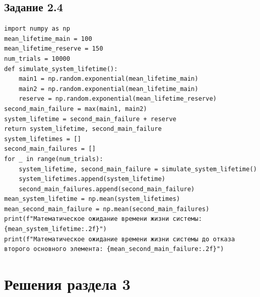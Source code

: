 \documentclass[otchet]{SCWorks}
\begin{document}
\subsection{Задание 2.4}
\label{ap_task2_4}
\begin{verbatim}
import numpy as np
mean_lifetime_main = 100
mean_lifetime_reserve = 150
num_trials = 10000
def simulate_system_lifetime():
    main1 = np.random.exponential(mean_lifetime_main)
    main2 = np.random.exponential(mean_lifetime_main)
    reserve = np.random.exponential(mean_lifetime_reserve)
second_main_failure = max(main1, main2)
system_lifetime = second_main_failure + reserve
return system_lifetime, second_main_failure
system_lifetimes = []
second_main_failures = []
for _ in range(num_trials):
    system_lifetime, second_main_failure = simulate_system_lifetime()
    system_lifetimes.append(system_lifetime)
    second_main_failures.append(second_main_failure)
mean_system_lifetime = np.mean(system_lifetimes)
mean_second_main_failure = np.mean(second_main_failures)
print(f"Математическое ожидание времени жизни системы: {mean_system_lifetime:.2f}")
print(f"Математическое ожидание времени жизни системы до отказа второго основного элемента: {mean_second_main_failure:.2f}")    
\end{verbatim}

\section{Решения раздела 3}
\end{document}
